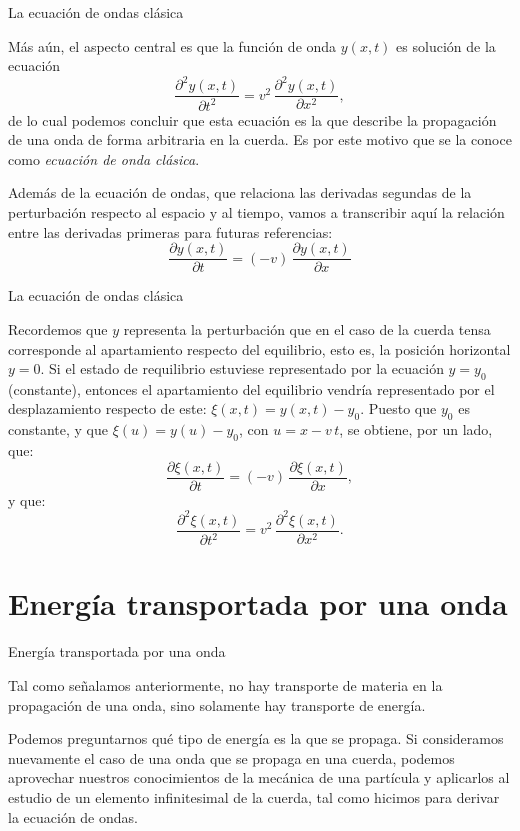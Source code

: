 \documentclass[11pt,handout,aspectratio=1610]{beamer}
\newcommand{\pdiff}[2]{\frac{\partial #1}{\partial #2}}
\newcommand{\pddiff}[2]{\frac{\partial^2 #1}{\partial #2^2}}
\newcommand{\vs}{\vspace{11pt}}
\begin{document}
\begin{frame}{La ecuación de ondas clásica}
    
    Más aún, el aspecto central es que la función de onda $y(x,t)$ es solución de la ecuación $$ \pddiff{y (x,t)}{t} = v^2 \, \pddiff{y (x,t)}{x}, $$ de lo cual podemos concluir que esta ecuación es la que describe la propagación de una onda de forma arbitraria en la cuerda. Es por este motivo que se la conoce como \emph{ecuación de onda clásica}.

    \vs

    Además de la ecuación de ondas, que relaciona las derivadas segundas de la perturbación respecto al espacio y al tiempo, vamos a transcribir aquí la relación entre las derivadas primeras para futuras referencias:
    $$ \pdiff{y(x,t)}{t} = \left(-v\right) \, \pdiff{y(x,t)}{x} $$
    
\end{frame}

\begin{frame}{La ecuación de ondas clásica}

    Recordemos que $y$ representa la perturbación que en el caso de la cuerda tensa corresponde al apartamiento respecto del equilibrio, esto es, la posición horizontal $y=0$. Si el estado de requilibrio estuviese representado por la ecuación $y=y_0$ (constante), entonces el apartamiento del equilibrio vendría representado por el desplazamiento respecto de este: $\xi(x,t) = y(x,t) - y_0$. Puesto que $y_0$ es constante, y que $\xi(u) = y(u) - y_0$, con $u= x-v\,t$, se obtiene, por un lado, que: $$ \pdiff{\xi (x,t)}{t} = \left(-v\right) \, \pdiff{\xi(x,t)}{x}, $$ y que: $$ \pddiff{\xi (x,t)}{t} = v^2 \, \pddiff{\xi (x,t)}{x}. $$
    
\end{frame}

\section{Energía transportada por una onda}

\begin{frame}{Energía transportada por una onda}

    Tal como señalamos anteriormente, no hay transporte de materia en la propagación de una onda, sino solamente hay transporte de energía. 
    
    \vs 
    
    Podemos preguntarnos qué tipo de energía es la que se propaga. Si consideramos nuevamente el caso de una onda que se propaga en una cuerda, podemos aprovechar nuestros conocimientos de la mecánica de una partícula y aplicarlos al estudio de un elemento infinitesimal de la cuerda, tal como hicimos para derivar la ecuación de ondas.

\end{frame}
\end{document}
